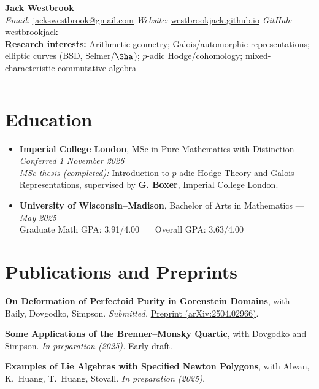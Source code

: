 \documentclass[11pt, a4paper]{article}
\newcommand{\sectionsep}{\vspace{0.28cm}}
\newenvironment{publist}{%
  \begin{list}{}{%
    \setlength{\leftmargin}{1.2em}%
    \setlength{\itemindent}{-1.2em}%
    \setlength{\itemsep}{0.25em}%
    \setlength{\parsep}{0pt}%
  }%
}{\end{list}}
\newcommand{\middot}{\ \textperiodcentered\ }
\begin{document}
\begin{center}
    {\Large\bfseries Jack Westbrook}\\[0.1cm]
    \textit{Email:} \href{mailto:jackswestbrook@gmail.com}{jackswestbrook@gmail.com} \quad
    \textit{Website:} \href{https://westbrookjack.github.io/}{westbrookjack.github.io} \quad
    \textit{GitHub:} \href{https://github.com/westbrookjack}{westbrookjack}\\[0.1cm]
    {\small \textbf{Research interests:} Arithmetic geometry; Galois/automorphic representations; elliptic curves (BSD, Selmer/\(\Sha\)); \(p\)-adic Hodge/cohomology; mixed-characteristic commutative algebra}
\end{center}

\hrule
\sectionsep

\section*{Education}
\begin{itemize}[leftmargin=*, label={}]
  \item \textbf{Imperial College London}, MSc in Pure Mathematics with Distinction — \textit{Conferred 1 November 2026}\\
  \textit{MSc thesis (completed):} Introduction to \(p\)-adic Hodge Theory and Galois Representations, supervised by \textbf{G. Boxer}, Imperial College London.

  \item \textbf{University of Wisconsin–Madison}, Bachelor of Arts in Mathematics — \textit{May 2025}\\
  Graduate Math GPA: 3.91/4.00 \middot\ Overall GPA: 3.63/4.00
\end{itemize}

\sectionsep

\section*{Publications and Preprints}
\begin{publist}
  \item \textbf{On Deformation of Perfectoid Purity in Gorenstein Domains}, with Baily, Dovgodko, Simpson. \textit{Submitted.} 
  \href{https://arxiv.org/abs/2504.02966}{Preprint (arXiv:2504.02966)}.

  \item \textbf{Some Applications of the Brenner–Monsky Quartic}, with Dovgodko and Simpson. \textit{In preparation (2025).}
  \href{https://lsa.umich.edu/content/dam/math-assets/reu-su22/reu-2024/Dovgodko%20and%20Westbrook_hkm_two_parameters.pdf}{Early draft}.

  \item \textbf{Examples of Lie Algebras with Specified Newton Polygons}, with Alwan, K.~Huang, T.~Huang, Stovall. \textit{In preparation (2025).}
\end{publist}
\end{document}
